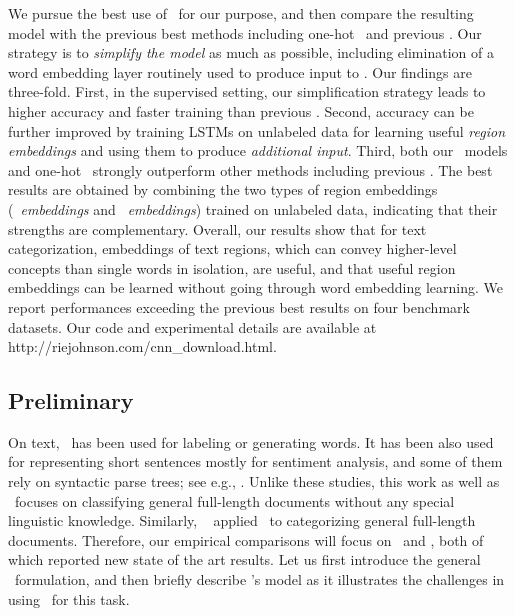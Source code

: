 \documentclass{article}
\begin{document}
We pursue the best use of \lstm\ for our purpose, and then compare the resulting model 
with the previous best methods including one-hot \cnn\ and previous \lstm.  
Our strategy is to {\em simplify the model} as much as possible, 
including elimination of a word embedding layer routinely used to produce input to \lstm. 
Our findings are three-fold.  
First, in the supervised setting, 
our simplification strategy 
leads to higher accuracy and faster training than previous \lstm. 
Second, 
accuracy can be further improved by training 
LSTMs on unlabeled data 
for learning useful {\em region embeddings} and using them to produce {\em additional input}. 
Third, 
both our \lstm\ models and one-hot \cnn\ 
strongly outperform other methods including 
previous \lstm.  The best results are obtained by combining the two types of region embeddings 
({\em \lstm\ embeddings} and {\em \cnn\ embeddings}) trained on unlabeled data,  
indicating that their strengths are complementary. 
Overall, our results show that for text categorization, 
embeddings of text regions, which can convey higher-level concepts than single words in isolation, 
are useful, 
and that useful region embeddings can be learned 
without going through word embedding learning. 
We report performances exceeding the previous best results on four benchmark datasets. 
Our code and experimental details are available 
at http://riejohnson.com/cnn\_download.html. 

\subsection{Preliminary} 


On text, \lstm\ has been used for labeling or generating words.  
It has been also used for representing short sentences 
mostly for sentiment analysis, and some of them rely on syntactic parse trees; 
see e.g., \cite{ZSG15,TQL15,TSM15,LZ15}. Unlike these studies, 
this work as well as \JZab\ 
focuses on classifying general full-length documents without any special linguistic knowledge. 
Similarly, 
\DLa\ \cite{DL15} applied \lstm\ to categorizing general full-length documents. 
Therefore, 
our empirical comparisons will focus on \DLa\ and \JZab, both of which reported 
new state of the art results. 
Let us first introduce the general \lstm\ formulation, 
and then briefly describe \DLa's model as it illustrates the challenges in using \lstms\ for this task.
\end{document}
